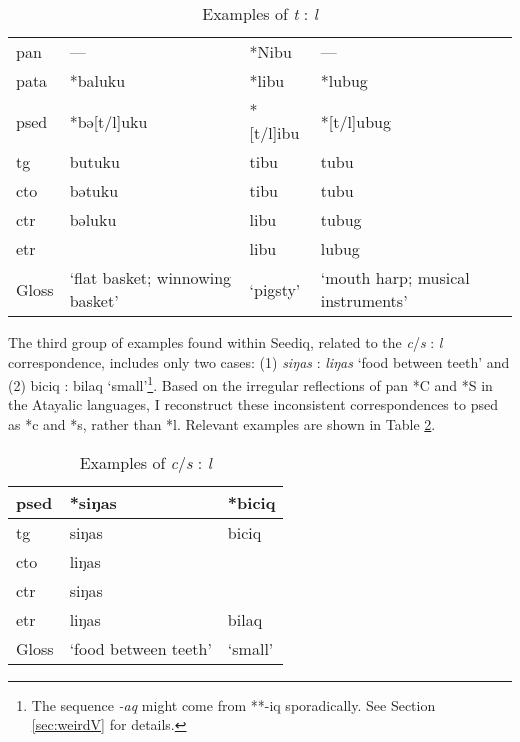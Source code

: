 \begin{table}[!htbp]
\centering
\caption{Examples of \textit{t} : \textit{l}}
\label{tab:irr_tl}
\begin{tabular}{llll}
\hline
\acs{pan}  & ---                             & *Nibu    & ---                               \\
\acs{pata} & *baluku                         & *libu    & *lubug                            \\ \hline
\ac{psed}  & *bə[t/l]uku                     & *[t/l]ibu & *[t/l]ubug                        \\ \hdashline
\ac{tg}    & butuku                          & tibu      & tubu                              \\
\ac{cto}   & bətuku                          & tibu      & tubu                              \\
\ac{ctr}   & bəluku                          & libu      & tubug                             \\
\ac{etr}   &                                 & libu      & lubug                             \\ \hline
Gloss      & `flat basket; winnowing basket' & `pigsty'  & `mouth harp; musical instruments' \\ \hline
\end{tabular}
\end{table}

The third group of examples found within Seediq, related to the \textit{c}/\textit{s} : \textit{l} correspondence, includes only two cases: (1) \textit{siŋas} : \textit{liŋas} `food between teeth' and (2) biciq : bilaq `small'\footnote{The sequence \textit{-aq} might come from **-iq sporadically. See Section \ref{sec:weirdV} for details.}. Based on the irregular reflections of \acl{pan} *C and *S in the Atayalic languages, I reconstruct these inconsistent correspondences to \acl{psed} as *c and *s, rather than *l. Relevant examples are shown in Table \ref{tab:irr_cls}.

\begin{table}[!htbp]
\centering
\caption{Examples of \textit{c}/\textit{s} : \textit{l}}
\label{tab:irr_cls}
\begin{tabular}{lll}
\hline
\acs{psed} & *siŋas               & *biciq  \\ \hline
\acs{tg}   & siŋas                & biciq   \\ 
\acs{cto}  & liŋas                &         \\
\acs{ctr}  & siŋas                &         \\
\acs{etr}  & liŋas                & bilaq   \\ \hline
Gloss      & `food between teeth' & `small' \\ \hline
\end{tabular}
\end{table}

